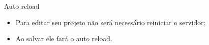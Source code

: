\documentclass{beamer}
\begin{document}
    \begin{frame}[label=lists]{Auto reload}
          \begin{itemize}
            \item Para editar seu projeto não será necessário reiniciar o servidor;
            \item Ao salvar ele fará o auto reload.
          \end{itemize}
        
    \end{frame}
%
%
  
\end{document}
